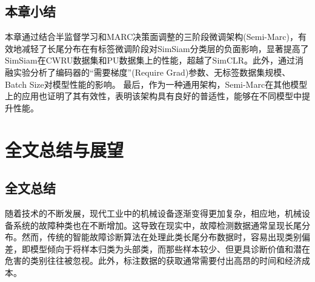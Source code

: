 \documentclass[master]{thesis-uestc}
\begin{document}
\FloatBarrier  %
\section{本章小结}

本章通过结合半监督学习和MARC决策面调整的三阶段微调架构(Semi-Marc)，有效地减轻了长尾分布在有标签微调阶段对SimSiam分类层的负面影响，显著提高了SimSiam在CWRU数据集和PU数据集上的性能，超越了SimCLR。此外，通过消融实验分析了编码器的“需要梯度”(Require Grad)参数、无标签数据集规模、Batch Size对模型性能的影响。
最后，作为一种通用架构，Semi-Marc在其他模型上的应用也证明了其有效性，表明该架构具有良好的普适性，能够在不同模型中提升性能。

\chapter{全文总结与展望}

\section{全文总结}
随着技术的不断发展，现代工业中的机械设备逐渐变得更加复杂，相应地，机械设备系统的故障种类也在不断增加。这导致在现实中，故障检测数据通常呈现长尾分布。然而，传统的智能故障诊断算法在处理此类长尾分布数据时，容易出现类别偏差，即模型倾向于将样本归类为头部类，而那些样本较少、但更具诊断价值和潜在危害的类别往往被忽视。此外，标注数据的获取通常需要付出高昂的时间和经济成本。
\end{document}
